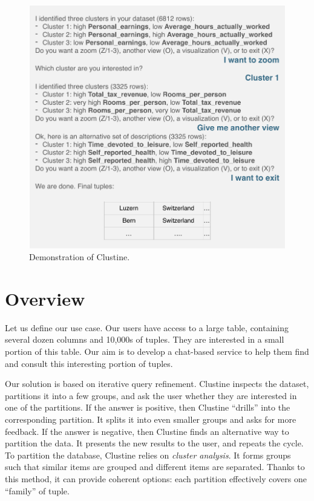 \begin{figure}[t]
  \centering
  \includegraphics[width=\columnwidth]{Experiments/UseCaseIntro}
  \caption{Demonstration of Clustine.}
  \label{fig:Overview}
\end{figure}
\section{Overview}
\label{sec:overview}

Let us define our use case. Our users have access to a large table, containing
several dozen columns and 10,000s of tuples. They are interested in a small
portion of this table.  Our aim is to develop a chat-based service to help them
find and consult this interesting portion of tuples.

Our solution is based on iterative query refinement. Clustine inspects the
dataset, partitions it into a few groups, and ask the user whether they are
interested in one of the partitions. If the answer is positive, then Clustine
``drills'' into the corresponding partition. It splits it into even smaller
groups and asks for more feedback.  If the answer is negative, then Clustine
finds an alternative way to partition the data. It presents the new results to
the user, and repeats the cycle.  To partition the database, Clustine relies on
\emph{cluster analysis}. It forms groups such that similar items are grouped
and different items are separated.  Thanks to this method, it can provide
coherent options: each partition effectively covers one ``family'' of tuple.

